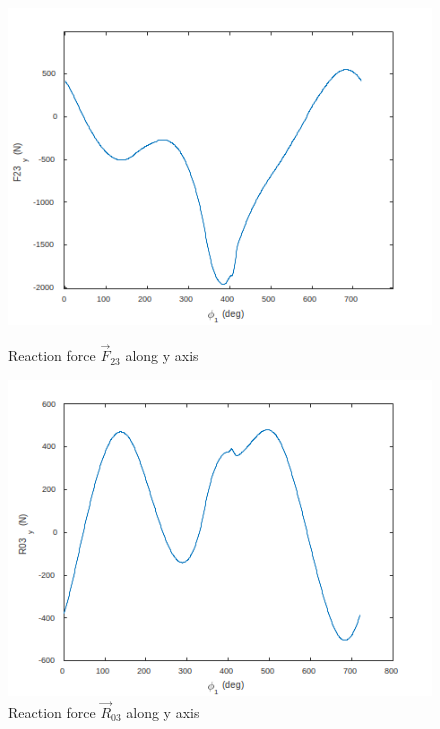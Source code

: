 \begin{figure}
	\centering
	\begin{minipage}{0.45\linewidth}
		\centering
		\includegraphics[width=\linewidth]{09}
		\caption{Reaction force $\vec{F}_{23}$ along y axis}
		\label{fig:09}
	\end{minipage}\hfill
	\begin{minipage}{0.45\linewidth}
		\centering
		\includegraphics[width=\linewidth]{10}
		\caption{Reaction force $\vec{R}_{03}$ along y axis}
		\label{fig:10}
	\end{minipage}
\end{figure}

